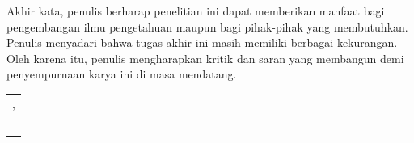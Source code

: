 Akhir kata, penulis berharap penelitian ini dapat memberikan manfaat bagi pengembangan ilmu pengetahuan maupun bagi pihak-pihak yang membutuhkan. Penulis menyadari bahwa tugas akhir ini masih memiliki berbagai kekurangan. Oleh karena itu, penulis mengharapkan kritik dan saran yang membangun demi penyempurnaan karya ini di masa mendatang.

\begin{flushright}
	\begin{tabular}[b]{c}
		\place{}, \MONTH{} \the\year{} \\
		\\
		\\
		\\
		\\
		\name{}
	\end{tabular}
\end{flushright}
